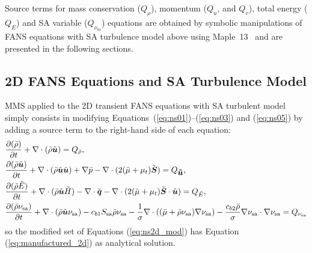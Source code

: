 \documentclass[10pt]{article}
\newcommand{\Diff}[2] {\dfrac{\partial( #1)}{\partial #2}}
\newcommand{\bv}[1]{\ensuremath{\mbox{\boldmath$ #1 $}}}
\newcommand{\sa}{\nu_{\mathrm{sa}}}
\newcommand{\tsa}{\mathrm{sa}}
\newcommand{\brho}{\bar{\rho}}
\newcommand{\tu}{\tilde{u}}
\newcommand{\tE}{\tilde{E}}
\newcommand{\bmu}{\bar{\mu}}
\begin{document}
Source terms  for mass conservation ($Q_\rho$), momentum ($Q_u$, and $Q_v$), total energy ($Q_{E}$) and SA variable ($Q_{\sa}$) equations are obtained by symbolic manipulations of FANS equations with SA turbulence model above using Maple~13~\citep{Maple} and are presented in the following sections.



 \subsection{2D FANS Equations and SA Turbulence Model}\label{NS+SA}



MMS applied to the 2D transient FANS equations with SA turbulent model simply consists in modifying Equations~(\ref{eq:ns01})--(\ref{eq:ns03}) and (\ref{eq:ns05})  by adding a source term to the right-hand side of each equation:
 \begin{equation}
 \begin{split} \label{eq:ns2d_mod}
 &\Diff{\bar{\rho}}{t} +\nabla \cdot \left(\bar{\rho} \tilde{\bv{u}}\right) = Q_{\brho},\\
 &\Diff{\bar{\rho} \tilde{\bv{u}}}{t} +\nabla\cdot\left(\bar{\rho} \tilde{\bv{u}}\tilde{\bv{u}}\right) +\nabla \bar{p} -  \nabla \cdot ( 2(\bmu+\mu_t) \tilde{\bv{S}} )= Q_{\bv{\tu}},\\
 & \Diff{\bar{\rho} \tilde{E}}{t}+ \nabla \cdot (\bar{\rho} \tilde{\bv{u}} \tilde{H})-\nabla \cdot \bar{\bv{q}} - \nabla\cdot(2 (\bmu+\mu_t) \tilde{\bv{S}} \cdot \tilde{\bv{u}})= Q_{\tE},\\
 &\Diff{\bar{\rho} \sa}{t} +\nabla \cdot (\bar{\rho} \tilde{\bv{u}} \sa) - c_{b1} S_\tsa \bar{\rho} \sa - \dfrac{1 }{\sigma}\nabla \cdot \left( (\bmu+\bar{\rho}  \sa) \nabla \sa\right) -\dfrac{c_{b2} \bar{\rho} }{\sigma} \nabla \sa \cdot \nabla \sa =Q_{\sa}
 \end{split}
 \end{equation}
so the modified set of Equations (\ref{eq:ns2d_mod}) has Equation (\ref{eq:manufactured_2d}) as analytical solution.
\end{document}
